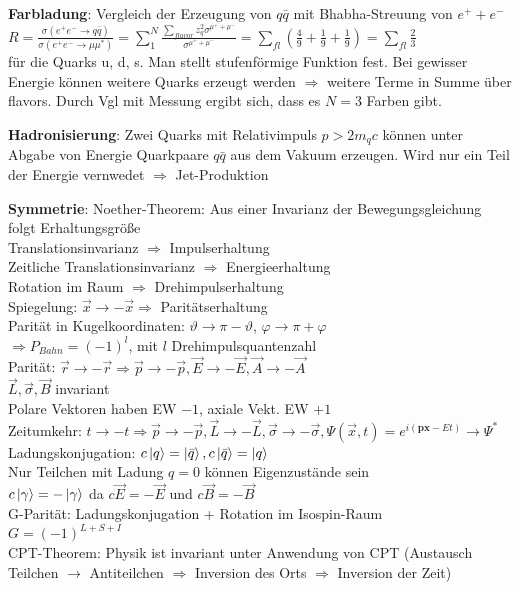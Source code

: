 \documentclass[10pt,twoside,a4paper]{article}
\begin{document}
\begin{multicols*}{3}
\textbf{Farbladung}: Vergleich der Erzeugung von $q\bar{q}$ mit Bhabha-Streuung von $e^+ + e^-$ \\
$R = \frac{\sigma \left( e^+ e^- \to q \bar{q} \right)}{\sigma \left( e^+ e^- \to \mu \mu^* \right)} = \sum_1^N \frac{\sum_{flavor} z^2_q \sigma^{\mu^+ + \mu^-}}{\sigma^{\mu^+ + \mu^-}} = \sum_{fl} \left( \frac{4}{9} + \frac{1}{9} + \frac{1}{9} \right) = \sum_{fl} \frac{2}{3}$ \\
für die Quarks u, d, s. Man stellt stufenförmige Funktion fest. Bei gewisser Energie können weitere Quarks erzeugt werden $\Rightarrow$ weitere Terme in Summe über flavors. Durch Vgl mit Messung ergibt sich, dass es $N=3$ Farben gibt.

\textbf{Hadronisierung}: Zwei Quarks mit Relativimpuls $p > 2 m_q c$ können unter Abgabe von Energie Quarkpaare $q\bar{q}$ aus dem Vakuum erzeugen. Wird nur ein Teil der Energie vernwedet $\Rightarrow$ Jet-Produktion 

\textbf{Symmetrie}: Noether-Theorem: Aus einer Invarianz der Bewegungsgleichung folgt Erhaltungsgröße \\
Translationsinvarianz $\Rightarrow$ Impulserhaltung \\
Zeitliche Translationsinvarianz $\Rightarrow$ Energieerhaltung \\
Rotation im Raum $\Rightarrow$ Drehimpulserhaltung \\
Spiegelung: $\vec{x} \to - \vec{x} \Rightarrow$ Paritätserhaltung \\
Parität in Kugelkoordinaten: $\vartheta \to \pi - \vartheta$, $\varphi \to \pi + \varphi$ \\
$\Rightarrow P_{Bahn} = (-1)^l$, mit $l$ Drehimpulsquantenzahl \\ 
Parität: $\vec{r} \to - \vec{r} \Rightarrow \vec{p} \to - \vec{p}, \vec{E} \to - \vec{E}, \vec{A} \to - \vec{A}$ \\ $\vec{L}, \vec{\sigma}, \vec{B}$ invariant \\
Polare Vektoren haben EW $-1$, axiale Vekt. EW $+1$ \\
Zeitumkehr: $t \to -t \Rightarrow \vec{p} \to -\vec{p}, \vec{L} \to - \vec{L}, \vec{\sigma} \to - \vec{\sigma}, \Psi (\vec{x},t) = e^{i(\textbf{px} - E t)} \to \Psi^*$ \\
Ladungskonjugation: $c \ket{q} = \ket{\bar{q}}, c \ket{\bar{q}} = \ket{q}$ \\
Nur Teilchen mit Ladung $q = 0$ können Eigenzustände sein \\
$c \ket{\gamma} = - \ket{\gamma}$ da $c \vec{E} = - \vec{E}$ und $c \vec{B} = - \vec{B}$ \\
G-Parität: Ladungskonjugation + Rotation im Isospin-Raum \\
$G = (-1)^{L+S+I}$ \\
CPT-Theorem: Physik ist invariant unter Anwendung von CPT (Austausch Teilchen $\to$ Antiteilchen $\Rightarrow$ Inversion des Orts $\Rightarrow$ Inversion der Zeit)


\end{multicols*}
\end{document}
